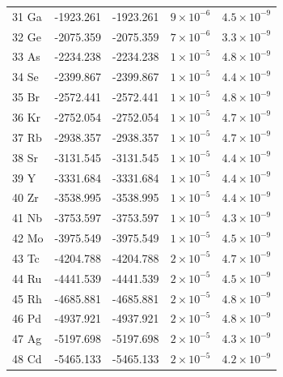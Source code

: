 \begin{longtable}{l r r r r}
31 Ga       &    -1923.261        &  -1923.261        &   $9\times10^{-6}$      &   $4.5\times10^{-9}$    \\
32 Ge       &    -2075.359        &  -2075.359        &   $7\times10^{-6}$      &   $3.3\times10^{-9}$    \\
33 As       &    -2234.238        &  -2234.238        &   $1\times10^{-5}$      &   $4.8\times10^{-9}$    \\
34 Se       &    -2399.867        &  -2399.867        &   $1\times10^{-5}$      &   $4.4\times10^{-9}$    \\
35 Br       &    -2572.441        &  -2572.441        &   $1\times10^{-5}$      &   $4.8\times10^{-9}$    \\
36 Kr       &    -2752.054        &  -2752.054        &   $1\times10^{-5}$      &   $4.7\times10^{-9}$    \\
37 Rb       &    -2938.357        &  -2938.357        &   $1\times10^{-5}$      &   $4.7\times10^{-9}$    \\
38 Sr       &    -3131.545        &  -3131.545        &   $1\times10^{-5}$      &   $4.4\times10^{-9}$    \\
39 Y        &    -3331.684        &  -3331.684        &   $1\times10^{-5}$      &   $4.4\times10^{-9}$    \\
40 Zr       &    -3538.995        &  -3538.995        &   $1\times10^{-5}$      &   $4.4\times10^{-9}$    \\
41 Nb       &    -3753.597        &  -3753.597        &   $1\times10^{-5}$      &   $4.3\times10^{-9}$    \\
42 Mo       &    -3975.549        &  -3975.549        &   $1\times10^{-5}$      &   $4.5\times10^{-9}$    \\
43 Tc       &    -4204.788        &  -4204.788        &   $2\times10^{-5}$      &   $4.7\times10^{-9}$    \\
44 Ru       &    -4441.539        &  -4441.539        &   $2\times10^{-5}$      &   $4.5\times10^{-9}$    \\
45 Rh       &    -4685.881        &  -4685.881        &   $2\times10^{-5}$      &   $4.8\times10^{-9}$    \\
46 Pd       &    -4937.921        &  -4937.921        &   $2\times10^{-5}$      &   $4.8\times10^{-9}$    \\
47 Ag       &    -5197.698        &  -5197.698        &   $2\times10^{-5}$      &   $4.3\times10^{-9}$    \\
48 Cd       &    -5465.133        &  -5465.133        &   $2\times10^{-5}$      &   $4.2\times10^{-9}$    \\

\end{longtable}
